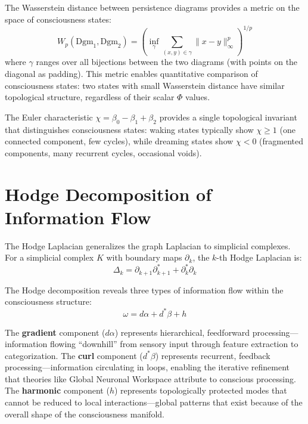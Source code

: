 \documentclass[12pt]{book}
\begin{document}
The Wasserstein distance between persistence diagrams provides a metric on the space of consciousness states:
\begin{equation}
W_p(\text{Dgm}_1, \text{Dgm}_2) = \left(\inf_{\gamma} \sum_{(x,y) \in \gamma} \|x - y\|^p_\infty\right)^{1/p}
\end{equation}
where $\gamma$ ranges over all bijections between the two diagrams (with points on the diagonal as padding). This metric enables quantitative comparison of consciousness states: two states with small Wasserstein distance have similar topological structure, regardless of their scalar $\Phi$ values.

The Euler characteristic $\chi = \beta_0 - \beta_1 + \beta_2$ provides a single topological invariant that distinguishes consciousness states: waking states typically show $\chi \geq 1$ (one connected component, few cycles), while dreaming states show $\chi < 0$ (fragmented components, many recurrent cycles, occasional voids).

\section{Hodge Decomposition of Information Flow}

The Hodge Laplacian generalizes the graph Laplacian to simplicial complexes. For a simplicial complex $K$ with boundary maps $\partial_k$, the $k$-th Hodge Laplacian is:
\begin{equation}
\Delta_k = \partial_{k+1}\partial_{k+1}^* + \partial_k^*\partial_k
\end{equation}

The Hodge decomposition reveals three types of information flow within the consciousness structure:
\begin{equation}\label{eq:hodge}
\omega = d\alpha + d^*\beta + h
\end{equation}

The \textbf{gradient} component ($d\alpha$) represents hierarchical, feedforward processing---information flowing ``downhill'' from sensory input through feature extraction to categorization. The \textbf{curl} component ($d^*\beta$) represents recurrent, feedback processing---information circulating in loops, enabling the iterative refinement that theories like Global Neuronal Workspace attribute to conscious processing. The \textbf{harmonic} component ($h$) represents topologically protected modes that cannot be reduced to local interactions---global patterns that exist because of the overall shape of the consciousness manifold.
\end{document}
